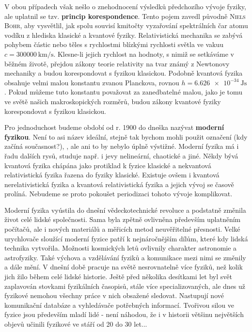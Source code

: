       V obou případech však nešlo o znehodnocení výsledků předchozího vývoje fyziky, ale uplatnil se
      tzv. \textbf{princip korespondence}. Tento pojem zavedl původně \textsc{Niels Bohr}, aby
      vysvětlil, jak spolu souvisí kmitočty vyzařování spektrálních čar atomu vodíku z hlediska
      klasické a kvantové fyziky. Relativistická mechanika se zabývá pohybem částic nebo těles s
      rychlostmi blízkými rychlosti světla ve vakuu \(c=\SI{300000}{\km\per\s}\). Klesne-li jejich
      rychlost na hodnoty, s nimiž se setkáváme v běžném životě, přejdou zákony teorie relativity na
      tvar známý z Newtonovy mechaniky a budou korespondovat s fyzikou klasickou. Podobně kvantová
      fyzika obsahuje velmi malou konstantu zvanou Planckova, rovnou \(h =
      \SI{6.626e-34}{\joule\s}\). Pokud můžeme tuto konstantu považovat za zanedbatelné malou,
      jako je tomu ve světě našich makroskopických rozměrů, budou zákony kvantové fyziky
      korespondovat s fyzikou klasickou.   

      
      Pro jednoduchost budeme období od r. 1900 do dneška nazývat \textbf{moderní fyzikou}. Není to
      asi název ideální, stejně tak bychom mohli použit označení  (kdy začíná
      současnost?), , ale ani to by nebylo úplně výstižné.
      Moderní fyzika má i řadu dalších rysů, studuje např. i jevy nelineární, chaotické a jiné.
      Někdy bývá kvantová fyzika chápána jako protiklad k fyzice klasické a nekvantová
      relativistická fyzika řazena do fyziky klasické. Existuje ovšem i kvantová nerelativistická
      fyzika a kvantová relativistická fyzika a jejich vývoj se časově prolíná. Nebudeme se proto
      pokoušet periodizaci tohoto vývoje komplikovat.

      Moderní fyzika vyústila do dnešní vědeckotechnické revoluce a podstatně změnila život celé
      lidské společnosti. Sama byla zpětně ovlivněna především uplatněním počítačů, ale i nových
      materiálů a měřicích metod neuvěřitelné přesnosti. Velké urychlovače sloužící moderní fyzice
      patří k nejnáročnějším dílům, které kdy lidská technika vytvořila. Možnosti kosmických letů
      ovlivnily charakter astronomie a astrofyziky. Také výchova a vzdělávání fyziků a komunikace
      mezi nimi se změnily a dále mění. V dnešní době pracuje na světě nesrovnatelně více fyziků,
      než kolik jich žilo během celé lidské historie. Ještě před několika desítkami let byl svět
      zaplavován stovkami fyzikálních časopisů, stále více specializovaných, ale dnes už fyzikové
      nemohou všechny práce v nich obsažené sledovat. Nastupují nové komunikační databáze a
      vyhledávače potřebných informací. Tvořivou silou ve fyzice jsou především mladí lidé - není
      náhodou, že i v historii většinu největších objevů učinili fyzikové ve stáří od 20 do 30
      let...

